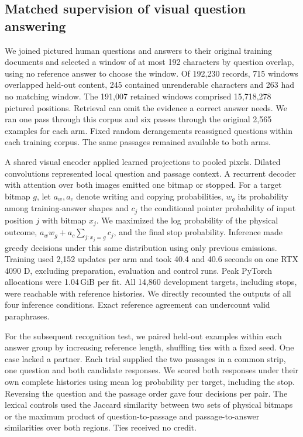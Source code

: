 \subsection*{Matched supervision of visual question answering}
We joined pictured human questions and answers to their original training documents and selected a window of at most 192 characters by question overlap, using no reference answer to choose the window. Of 192,230 records, 715 windows overlapped held-out content, 245 contained unrenderable characters and 263 had no matching window. The 191,007 retained windows comprised 15,718,278 pictured positions. Retrieval can omit the evidence a correct answer needs. We ran one pass through this corpus and six passes through the original 2,565 examples for each arm. Fixed random derangements reassigned questions within each training corpus. The same passages remained available to both arms.

A shared visual encoder applied learned projections to pooled pixels. Dilated convolutions represented local question and passage context. A recurrent decoder with attention over both images emitted one bitmap or stopped. For a target bitmap $g$, let $a_w,a_c$ denote writing and copying probabilities, $w_g$ its probability among training-answer shapes and $c_j$ the conditional pointer probability of input position $j$ with bitmap $x_j$. We maximized the log probability of the physical outcome, $a_w w_g+a_c\sum_{j:x_j=g}c_j$, and the final stop probability. Inference made greedy decisions under this same distribution using only previous emissions. Training used 2,152 updates per arm and took 40.4 and 40.6 seconds on one RTX 4090 D, excluding preparation, evaluation and control runs. Peak PyTorch allocations were 1.04\,GiB per fit. All 14,860 development targets, including stops, were reachable with reference histories. We directly recounted the outputs of all four inference conditions. Exact reference agreement can undercount valid paraphrases.

For the subsequent recognition test, we paired held-out examples within each answer group by increasing reference length, shuffling ties with a fixed seed. One case lacked a partner. Each trial supplied the two passages in a common strip, one question and both candidate responses. We scored both responses under their own complete histories using mean log probability per target, including the stop. Reversing the question and the passage order gave four decisions per pair. The lexical controls used the Jaccard similarity between two sets of physical bitmaps or the maximum product of question-to-passage and passage-to-answer similarities over both regions. Ties received no credit.
